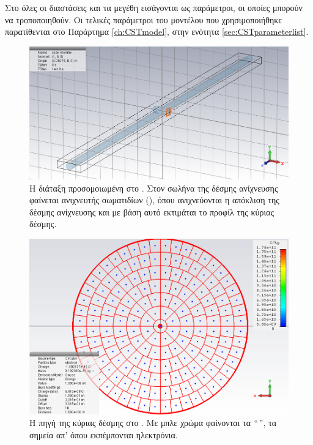 Στο  όλες οι διαστάσεις και τα μεγέθη εισάγονται ως παράμετροι, οι οποίες μπορούν να τροποποιηθούν. Οι τελικές παράμετροι του μοντέλου που χρησιμοποιήθηκε παρατίθενται στο Παράρτημα \ref{ch:CSTmodel}, στην ενότητα \ref{sec:CSTparameterlist}.

\begin{figure}[tbh]
\includegraphics[width=\textwidth]{figures/CST-pic-monitor}
\centering
\caption[Η διάταξη προσομοιωμένη στο .]
{Η διάταξη προσομοιωμένη στο . 
Στον σωλήνα της δέσμης ανίχνευσης φαίνεται ανιχνευτής σωματιδίων (), όπου ανιχνεύονται η απόκλιση της δέσμης ανίχνευσης και με βάση αυτό εκτιμάται το προφίλ της κύριας δέσμης.}
\label{fig:CST-PICmonitor}
\end{figure}

\begin{figure}[tbh]
\includegraphics[width=\textwidth]{figures/CST-main-beam-source}
\centering
\caption[Η πηγή της κύριας δέσμης στο .]
{Η πηγή της κύριας δέσμης στο . 
Με μπλε χρώμα φαίνονται τα $``$$"$, τα σημεία απ' όπου εκπέμπονται ηλεκτρόνια.}
\label{fig:CST-mainBeamSource}
\end{figure}


